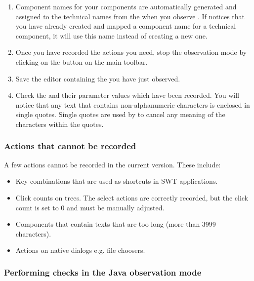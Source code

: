 \begin{enumerate}
\item Component names for your components are automatically generated and assigned to the technical names from the \gdaut{} when you observe \gdsteps{}. If \jb{} notices that you have already created and mapped a component name for a technical component, it will use this name instead of creating a new one. 
\item Once you have recorded the actions you need, stop the observation mode by clicking on the  button 
on the main toolbar.
\item Save the \gdcase{} editor containing the \gdsteps{} you have just observed. 
\item Check the \gdsteps{} and their parameter values which have been recorded. 
You will notice that any text that contains non-alphanumeric characters is enclosed in single quotes. Single quotes are used by \jb{} to cancel any meaning of the characters within the quotes. 
\end{enumerate}

\subsubsection{Actions that cannot be recorded}
A few actions cannot be recorded in the current version. These include:
\begin{itemize}
\item Key combinations that are used as shortcuts in SWT applications.
\item Click counts on trees. The select actions are correctly recorded, but the click count is set to 0 and must be manually adjusted. 
\item Components that contain texts that are too long (more than 3999 characters). 
\item Actions on native dialogs e.g. file choosers. 
\end{itemize}

\subsubsection{Performing checks in the Java observation mode}
\label{TasksObsCheckJava}

